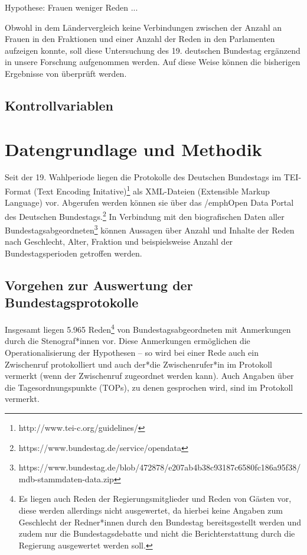 \documentclass[12pt, 
    twoside=false, 
    bibliography=totoc, 
    numbers=endperiod, 
    headings=normal, 
    toc=chapterentrydotfill
    ]{scrbook}
\begin{document}
Hypothese: Frauen weniger Reden ... 

 Obwohl \textcite{back_2018} in dem Ländervergleich keine Verbindungen zwischen der Anzahl an Frauen in den Fraktionen und einer Anzahl der Reden in den Parlamenten aufzeigen konnte, soll diese Untersuchung des 19. deutschen Bundestag ergänzend in unsere Forschung aufgenommen werden. Auf diese Weise können die bisherigen Ergebnisse von \textcite{back_2018} überprüft werden.

\section{Kontrollvariablen}

\chapter{Datengrundlage und Methodik}

Seit der 19. Wahlperiode liegen die Protokolle des Deutschen Bundestags im TEI-Format (Text Encoding Initative)\footnote{http://www.tei-c.org/guidelines/} als XML-Dateien (Extensible Markup Language) vor. Abgerufen werden können sie über das /emph{Open Data Portal} des Deutschen Bundestags.\footnote{https://www.bundestag.de/service/opendata} In Verbindung mit den biografischen Daten aller Bundestagsabgeordneten\footnote{https://www.bundestag.de/blob/472878/e207ab4b38c93187c6580fc186a95f38/mdb-stammdaten-data.zip} können Aussagen über Anzahl und Inhalte der Reden nach Geschlecht, Alter, Fraktion und beispielsweise Anzahl der Bundestagsperioden getroffen werden.

\section{Vorgehen zur Auswertung der Bundestagsprotokolle}


Insgesamt liegen 5.965 Reden\footnote{Es liegen auch Reden der Regierungsmitglieder und Reden von Gästen vor, diese werden allerdings nicht ausgewertet, da hierbei keine Angaben zum Geschlecht der Redner*innen durch den Bundestag bereitsgestellt werden und zudem nur die Bundestagsdebatte und nicht die Berichterstattung durch die Regierung ausgewertet werden soll.} von Bundestagsabgeordneten mit Anmerkungen durch die Stenograf*innen vor. Diese Anmerkungen ermöglichen die Operationalisierung der Hypothesen -- so wird bei einer Rede auch ein Zwischenruf protokolliert und auch der*die Zwischenrufer*in im Protokoll vermerkt (wenn der Zwischenruf zugeordnet werden kann). Auch Angaben über die Tagesordnungspunkte (TOPs), zu denen gesprochen wird, sind im Protokoll vermerkt.
\end{document}
